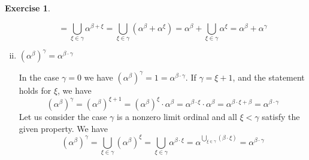 \documentclass{article}
\theoremstyle{definition}
\newtheorem{exer}{Exercise}[section]
\newlength{\defparindent}
\newenvironment{answer}
    {\begin{mdframed}[backgroundcolor=gray!15, linewidth=0pt] \setlength{\parindent}{\defparindent}}
    {\end{mdframed}}
\begin{document}
\begin{exer}
\begin{enumerate}[(i)]
\begin{answer}
\[                =  
                \bigcup_{\xi \in \gamma} \alpha^{\beta + \xi}
                =  
                \bigcup_{\xi \in \gamma} (\alpha^{\beta} + \alpha^{\xi})
                =
                \alpha^{\beta} + \bigcup_{\xi \in \gamma} \alpha^{\xi}
                =
                \alpha^{\beta} + \alpha^{\gamma}
            \]
        \end{answer}
        \item $(\alpha^\beta)^\gamma = \alpha^{\beta \cdot \gamma}$
        \begin{answer}
            In the case $\gamma = 0$ we have $(\alpha^{\beta})^{\gamma} = 1 = \alpha^{\beta \cdot \gamma}$. If $\gamma = \xi + 1$, and the statement holds for $\xi$,  we have 
            \[
                (\alpha^{\beta})^{\gamma} 
                = 
                (\alpha^{\beta})^{\xi + 1}
                =
                (\alpha^{\beta})^{\xi} \cdot \alpha^{\beta}
                =
                \alpha^{\beta \cdot \xi} \cdot \alpha^{\beta}
                =
                \alpha^{\beta \cdot \xi + \beta}
                =
                \alpha^{\beta \cdot \gamma}
            \]
            Let us consider the case $\gamma$ is a nonzero limit ordinal and all $\xi < \gamma$ satisfy the given property. We have
            \[
                (\alpha^{\beta})^{\gamma}
                =
                \bigcup_{\xi \in \gamma} (\alpha^{\beta})^{\xi}
                =
                \bigcup_{\xi \in \gamma} \alpha^{\beta \cdot \xi} 
                =
                \alpha^{\bigcup_{\xi \in \gamma} (\beta \cdot \xi)} 
                =
                \alpha^{\beta \cdot \gamma} 
            \]
        \end{answer}
    \end{enumerate}
\end{exer}
\end{document}

